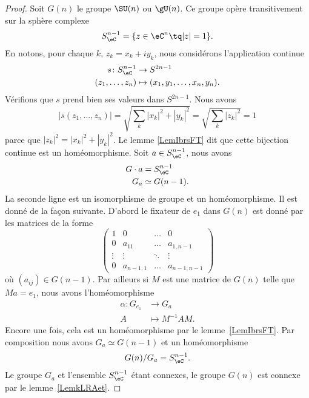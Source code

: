 \begin{proof}
	Soit \( G(n)\) le groupe \( \SU(n)\) ou \( \gU(n)\). Ce groupe opère transitivement sur la sphère complexe
	\begin{equation}
		S_{\eC}^{n-1}=\{ z\in \eC^n\tq | z |=1 \}.
	\end{equation}
	En notons, pour chaque \( k\), \( z_k=x_k+iy_k\), nous considérons l'application continue
	\begin{equation}
		\begin{aligned}
			s\colon S_{\eC}^{n-1} & \to S^{2n-1}                       \\
			(z_1,\ldots, z_n)     & \mapsto (x_1,y_1,\ldots, x_n,y_n).
		\end{aligned}
	\end{equation}
	Vérifions que \( s\) prend bien ses valeurs dans \( S^{2n-1}\). Nous avons
	\begin{equation}
		| s(z_1,\ldots, z_n) |=\sqrt{ \sum_k| x_k |^2+| y_k |^2 }=\sqrt{ \sum_k| z_k |^2 }=1
	\end{equation}
	parce que \( | z_k |^2=| x_k |^2+| y_k |^2\). Le lemme \ref{LemIbrsFT} dit que cette bijection continue est un homéomorphisme. Soit \( a\in S^{n-1}_{\eC}\), nous avons
	\begin{subequations}
		\begin{align}
			G\cdot a & =S^{n-1}_{\eC} \\
			G_a      & \simeq G(n-1).
		\end{align}
	\end{subequations}
	La seconde ligne est un isomorphisme de groupe et un homéomorphisme. Il est donné de la façon suivante. D'abord le fixateur de \( e_1\) dans \( G(n)\) est donné par les matrices de la forme
	\begin{equation}
		\begin{pmatrix}
			1      & 0         & \ldots & 0           \\
			0      & a_{11}    & \ldots & a_{1,n-1}   \\
			\vdots & \vdots    & \ddots & \vdots      \\
			0      & a_{n-1,1} & \ldots & a_{n-1,n-1}
		\end{pmatrix}
	\end{equation}
	où \( (a_{ij})\in G(n-1)\). Par ailleurs si \( M\) est une matrice de \( G(n)\) telle que \( Ma=e_1\), nous avons l'homéomorphisme
	\begin{equation}
		\begin{aligned}
			\alpha\colon G_{e_1} & \to G_a            \\
			A                    & \mapsto M^{-1} AM.
		\end{aligned}
	\end{equation}
	Encore une fois, cela est un homéomorphisme par le lemme~\ref{LemIbrsFT}. Par composition nous avons \( G_a\simeq G(n-1)\) et un homéomorphisme
	\begin{equation}
		G(n)/G_a=S^{n-1}_{\eC}.
	\end{equation}
	Le groupe \( G_a\) et l'ensemble \( S^{n-1}_{\eC}\) étant connexes, le groupe \( G(n)\) est connexe par le lemme~\ref{LemkLRAet}.
\end{proof}

